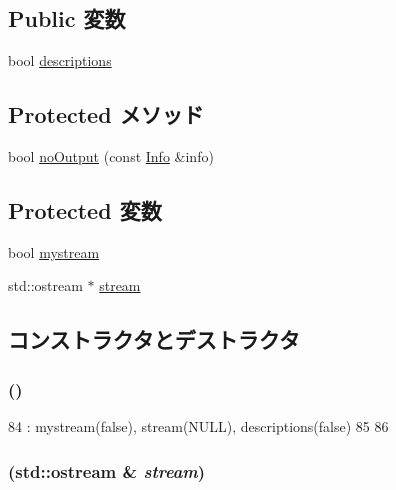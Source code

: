 \subsection*{Public 変数}
\begin{DoxyCompactItemize}
\item 
bool \hyperlink{classStats_1_1Text_ada0eec8923acca0939a06f40c6a88af8}{descriptions}
\end{DoxyCompactItemize}
\subsection*{Protected メソッド}
\begin{DoxyCompactItemize}
\item 
bool \hyperlink{classStats_1_1Text_a8641de3b6016a719808e25b94a9448e0}{noOutput} (const \hyperlink{classStats_1_1Info}{Info} \&info)
\end{DoxyCompactItemize}
\subsection*{Protected 変数}
\begin{DoxyCompactItemize}
\item 
bool \hyperlink{classStats_1_1Text_aa65f5a10ec2c985671c2f8696c43a3b4}{mystream}
\item 
std::ostream $\ast$ \hyperlink{classStats_1_1Text_adc3bdd1632f41d809c78a20c0733715c}{stream}
\end{DoxyCompactItemize}


\subsection{コンストラクタとデストラクタ}
\hypertarget{classStats_1_1Text_a950a98ae75562dc9c6a458acbd330143}{
\subsubsection[{Text}]{ ()}}
\label{classStats_1_1Text_a950a98ae75562dc9c6a458acbd330143}



\begin{DoxyCode}
84     : mystream(false), stream(NULL), descriptions(false)
85 {
86 }
\end{DoxyCode}
\hypertarget{classStats_1_1Text_a3ce64812d1237075ee99948c7c058118}{
\subsubsection[{Text}]{ (std::ostream \& {\em stream})}}
\label{classStats_1_1Text_a3ce64812d1237075ee99948c7c058118}




